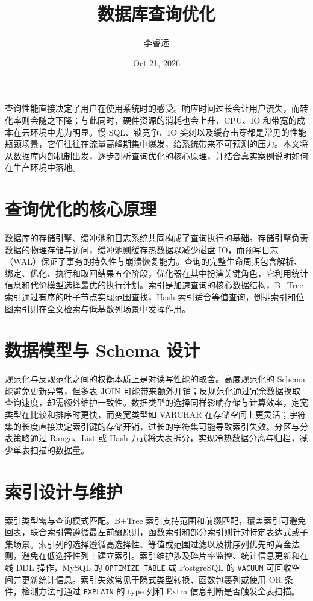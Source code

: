 \title{数据库查询优化}
\author{李睿远}
\date{Oct 21, 2026}
\maketitle
查询性能直接决定了用户在使用系统时的感受。响应时间过长会让用户流失，而转化率则会随之下降；与此同时，硬件资源的消耗也会上升，CPU、IO 和带宽的成本在云环境中尤为明显。慢 SQL、锁竞争、IO 尖刺以及缓存击穿都是常见的性能瓶颈场景，它们往往在流量高峰期集中爆发，给系统带来不可预测的压力。本文将从数据库内部机制出发，逐步剖析查询优化的核心原理，并结合真实案例说明如何在生产环境中落地。\par
\chapter{查询优化的核心原理}
数据库的存储引擎、缓冲池和日志系统共同构成了查询执行的基础。存储引擎负责数据的物理存储与访问，缓冲池则缓存热数据以减少磁盘 IO，而预写日志（WAL）保证了事务的持久性与崩溃恢复能力。查询的完整生命周期包含解析、绑定、优化、执行和取回结果五个阶段，优化器在其中扮演关键角色，它利用统计信息和代价模型选择最优的执行计划。索引是加速查询的核心数据结构，B+Tree 索引通过有序的叶子节点实现范围查找，Hash 索引适合等值查询，倒排索引和位图索引则在全文检索与低基数列场景中发挥作用。\par
\chapter{数据模型与 Schema 设计}
规范化与反规范化之间的权衡本质上是对读写性能的取舍。高度规范化的 Schema 能避免更新异常，但多表 JOIN 可能带来额外开销；反规范化通过冗余数据换取查询速度，却需额外维护一致性。数据类型的选择同样影响存储与计算效率，定宽类型在比较和排序时更快，而变宽类型如 VARCHAR 在存储空间上更灵活；字符集的长度直接决定索引键的存储开销，过长的字符集可能导致索引失效。分区与分表策略通过 Range、List 或 Hash 方式将大表拆分，实现冷热数据分离与归档，减少单表扫描的数据量。\par
\chapter{索引设计与维护}
索引类型需与查询模式匹配。B+Tree 索引支持范围和前缀匹配，覆盖索引可避免回表，联合索引需遵循最左前缀原则，函数索引和部分索引则针对特定表达式或子集场景。索引列的选择遵循高选择性、等值或范围过滤以及排序列优先的黄金法则，避免在低选择性列上建立索引。索引维护涉及碎片率监控、统计信息更新和在线 DDL 操作，MySQL 的 \texttt{OPTIMIZE TABLE} 或 PostgreSQL 的 \texttt{VACUUM} 可回收空间并更新统计信息。索引失效常见于隐式类型转换、函数包裹列或使用 OR 条件，检测方法可通过 \texttt{EXPLAIN} 的 type 列和 Extra 信息判断是否触发全表扫描。\par
